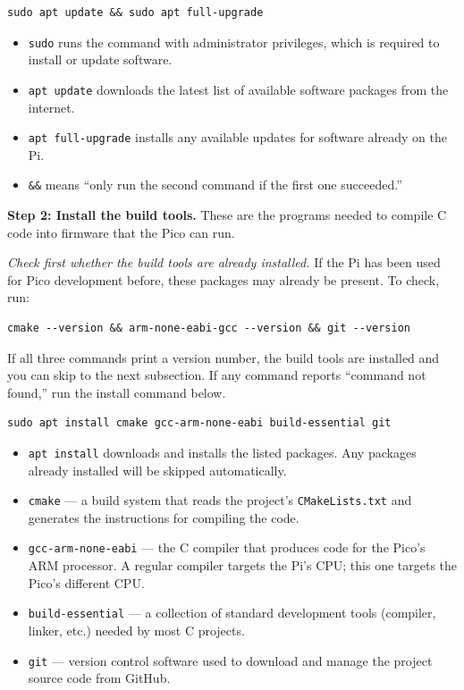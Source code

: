 \documentclass[main.tex]{subfiles}
\begin{document}
\begin{verbatim}
sudo apt update && sudo apt full-upgrade
\end{verbatim}

\begin{itemize}
    \item \texttt{sudo} runs the command with administrator privileges, which is required to install or update software.
    \item \texttt{apt update} downloads the latest list of available software packages from the internet.
    \item \texttt{apt full-upgrade} installs any available updates for software already on the Pi.
    \item \texttt{\&\&} means ``only run the second command if the first one succeeded.''
\end{itemize}

\noindent \textbf{Step 2: Install the build tools.} These are the programs needed to compile C code into firmware that the Pico can run.

\vspace{6pt}
\noindent \textit{Check first whether the build tools are already installed.} If the Pi has been used for Pico development before, these packages may already be present. To check, run:

\begin{verbatim}
cmake --version && arm-none-eabi-gcc --version && git --version
\end{verbatim}

\noindent If all three commands print a version number, the build tools are installed and you can skip to the next subsection. If any command reports ``command not found,'' run the install command below.

\begin{verbatim}
sudo apt install cmake gcc-arm-none-eabi build-essential git
\end{verbatim}

\begin{itemize}
    \item \texttt{apt install} downloads and installs the listed packages. Any packages already installed will be skipped automatically.
    \item \texttt{cmake} --- a build system that reads the project's \texttt{CMakeLists.txt} and generates the instructions for compiling the code.
    \item \texttt{gcc-arm-none-eabi} --- the C compiler that produces code for the Pico's ARM processor. A regular compiler targets the Pi's CPU; this one targets the Pico's different CPU.
    \item \texttt{build-essential} --- a collection of standard development tools (compiler, linker, etc.) needed by most C projects.
    \item \texttt{git} --- version control software used to download and manage the project source code from GitHub.
\end{itemize}
\end{document}
